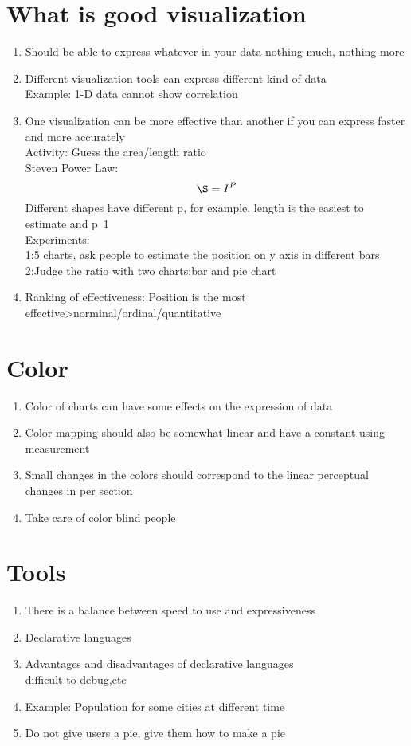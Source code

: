 \section{What is good visualization}
\begin{enumerate}
\item Should be able to express whatever in your data nothing much, nothing more
\item Different visualization tools can express different kind of data\\Example: 1-D data cannot show correlation
\item One visualization can be more effective than another if you can express faster and more accurately\\Activity: Guess the area/length ratio\\Steven Power Law:
\begin{equation}
  \S=I^P
\end{equation}
Different shapes have different p, for example, length is the easiest to estimate and p~1\\
Experiments:\\1:5 charts, ask people to estimate the position on y axis in different bars\\2:Judge the ratio with two charts:bar and pie chart
\item 
Ranking of effectiveness: Position is the most effective>norminal/ordinal/quantitative

\end{enumerate}

\section{Color}
\begin{enumerate}
\item Color of charts can have some effects on the expression of data
\item Color mapping should also be somewhat linear and have a constant using measurement
\item Small changes in the colors should correspond to the linear perceptual changes in per section
\item Take care of color blind people
\end{enumerate}

\section{Tools}
\begin{enumerate}
\item There is a balance between speed to use and expressiveness
\item Declarative languages
\item Advantages and disadvantages of declarative languages\\difficult to debug,etc
\item Example: Population for some cities at different time
\item Do not give users a pie, give them how to make a pie
\end{enumerate}


